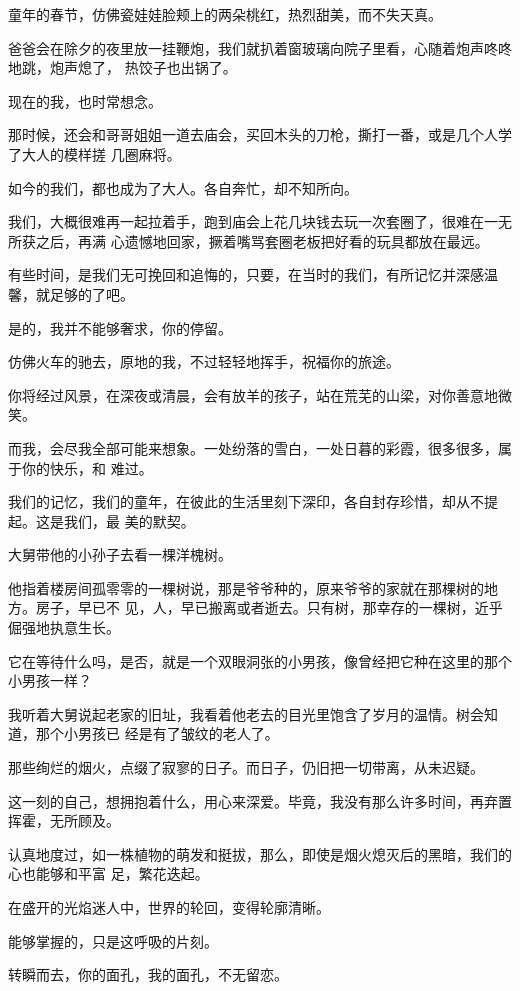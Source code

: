 		童年的春节，仿佛瓷娃娃脸颊上的两朵桃红，热烈甜美，而不失天真。

		爸爸会在除夕的夜里放一挂鞭炮，我们就扒着窗玻璃向院子里看，心随着炮声咚咚地跳，炮声熄了，
	热饺子也出锅了。

		现在的我，也时常想念。

		那时候，还会和哥哥姐姐一道去庙会，买回木头的刀枪，撕打一番，或是几个人学了大人的模样搓
	几圈麻将。

		如今的我们，都也成为了大人。各自奔忙，却不知所向。

		我们，大概很难再一起拉着手，跑到庙会上花几块钱去玩一次套圈了，很难在一无所获之后，再满
	心遗憾地回家，撅着嘴骂套圈老板把好看的玩具都放在最远。

		有些时间，是我们无可挽回和追悔的，只要，在当时的我们，有所记忆并深感温馨，就足够的了吧。

		是的，我并不能够奢求，你的停留。

		仿佛火车的驰去，原地的我，不过轻轻地挥手，祝福你的旅途。\par
		你将经过风景，在深夜或清晨，会有放羊的孩子，站在荒芜的山梁，对你善意地微笑。

		而我，会尽我全部可能来想象。一处纷落的雪白，一处日暮的彩霞，很多很多，属于你的快乐，和
	难过。

		我们的记忆，我们的童年，在彼此的生活里刻下深印，各自封存珍惜，却从不提起。这是我们，最
	美的默契。

		大舅带他的小孙子去看一棵洋槐树。

		他指着楼房间孤零零的一棵树说，那是爷爷种的，原来爷爷的家就在那棵树的地方。房子，早已不
	见，人，早已搬离或者逝去。只有树，那幸存的一棵树，近乎倔强地执意生长。

		它在等待什么吗，是否，就是一个双眼洞张的小男孩，像曾经把它种在这里的那个小男孩一样？

		我听着大舅说起老家的旧址，我看着他老去的目光里饱含了岁月的温情。树会知道，那个小男孩已
	经是有了皱纹的老人了。

		那些绚烂的烟火，点缀了寂寥的日子。而日子，仍旧把一切带离，从未迟疑。\par
		这一刻的自己，想拥抱着什么，用心来深爱。毕竟，我没有那么许多时间，再弃置挥霍，无所顾及。

		认真地度过，如一株植物的萌发和挺拔，那么，即使是烟火熄灭后的黑暗，我们的心也能够和平富
	足，繁花迭起。

		在盛开的光焰迷人中，世界的轮回，变得轮廓清晰。

		能够掌握的，只是这呼吸的片刻。\par
		转瞬而去，你的面孔，我的面孔，不无留恋。

